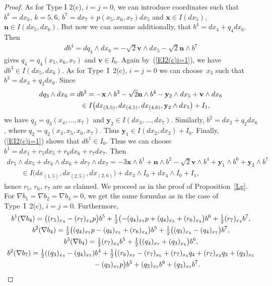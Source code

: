 \documentclass[pdftex]{sigma}
\numberwithin{equation}{section}
\newcommand\bx{{\mathbf x}}
\newcommand\by{{\mathbf y}}
\newcommand\bn{{\mathbf n}}
\newcommand\bv{{\mathbf v}}
\begin{document}
\begin{proof} As for Type I 2(c), $i=j=0$, we can introduce coordinates such that $b^k=dx_k$, $k=5,6$, $b^7= dx_7 +p(x_5,x_6,x_7)dx_5$ and	 $\bx\in I(dx_5)$, $\bn\in I(dx_5,dx_6)$. But now we can assume additionally, that $b^4=dx_4+q_4 dx_6$. Then
\begin{gather*}db^4=dq_4\wedge dx_6=-\sqrt2\bv\wedge dx_5-\sqrt 2 \bn\wedge b^7\end{gather*} gives $q_4=q_4(x_5,x_6,x_7)$ and $\bv\in I_0$.
Again by~(\ref{EI2(c)i=1}), we have $db^3\in I(dx_5,dx_6)$. As for Type~I~2(c), $i=j=0$ we can choose~$x_3$ such that $b^3=dx_3+q_3dx_6$. Since
\begin{gather*}
dq_3\wedge dx_6 = db^3=-\bx\wedge b^3 -\sqrt 2\bn\wedge b^4-\by_2\wedge dx_5+\bv\wedge dx_6\\
\hphantom{dq_3\wedge dx_6}{} \in I\big(dx_{(3,5)}, dx_{(4,5)}, dx_{(4,6)}, \by_2\wedge dx_5\big)+I_1,
\end{gather*}
we have $q_3=q_3(x_4,\dots,x_7)$ and $\by_2\in I(dx_3,\dots,dx_7)$.
Similarly, $b^2=dx_2+q_2dx_6$, where $q_2=q_2(x_3,x_5,x_6,x_7)$. Thus $\by_1\in I(dx_2,dx_3)+I_0$. Finally, (\ref{EI2(c)i=1}) shows that $db^1\in I_0$. Thus we can choose $b^1=dx_1+ r_5dx_5+r_6dx_6+r_7dx_7$. Then
\begin{gather*}
 dr_5\wedge dx_5+dr_6\wedge dx_6+dr_7\wedge dx_7= -3\bx\wedge b^1+\bn\wedge b^2-\sqrt2\bv\wedge b^4+\by_1\wedge b^6+\by_2\wedge b^7 \\
 \qquad{}\in I\big( dx_{(1,5)}, dx_{(2,5)}, dx_{(2,6)}\big)+ dx_3\wedge I_0 +dx_4\wedge I_0+I_1,
\end{gather*}
hence $r_5$, $r_6$, $r_7$ are as claimed. We proceed as in the proof of Proposition~\ref{Lg}. For $\nabla b_1=\nabla b_2=\nabla b_3 =0$, we get the same formulas as in the case of Type~I~2(c), $i=j=0$. Furthermore,
\begin{gather*}
b^1(\nabla b_4)= \big((r_5)_{x_4}-(r_7)_{x_4}p\big)b^5+\tfrac12\big({-}(q_4)_{x_7}p+(q_4)_{x_5}+(r_6)_{x_4} \big)b^6 + \tfrac12(r_7)_{x_4}b^7,\\
b^2(\nabla b_4)= \tfrac12\big((q_4)_{x_7}p-(q_4)_{x_5}+(r_6)_{x_4}\big)b^5 +\tfrac12\big((q_3)_{x_4}-(q_4)_{x_7}\big)b^7,\\
b^3(\nabla b_4)= \tfrac12(r_7)_{x_4}b^5+\tfrac12\big((q_4)_{x_7}+(q_3)_{x_4}\big)b^6,\\
b^2(\nabla b_7)= \tfrac12((q_3)_{x_4}-(q_4)_{x_7})b^4 +\tfrac12\big((r_6)_{x_7} -(r_7)_{x_6}+(r_7)_{x_4}q_4+(r_7)_{x_3}q_3+(q_3)_{x_5} \\
\hphantom{b^2(\nabla b_7)=}{} -(q_3)_{x_7}p\big)b^5 +(q_2)_{x_7}b^6 +(q_3)_{x_7}b^7.

\end{gather*}
\end{proof}
\end{document}
